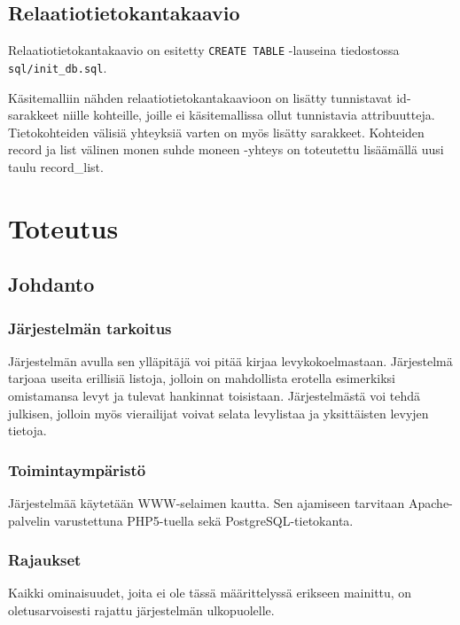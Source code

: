 \documentclass[a4paper,12pt]{report}
\begin{document}
\section{Relaatiotietokantakaavio}

Relaatiotietokantakaavio on esitetty \texttt{CREATE TABLE} -lauseina
tiedostossa \texttt{sql/init\_db.sql}.

Käsitemalliin nähden relaatiotietokantakaavioon on lisätty tunnistavat
id-sarakkeet niille kohteille, joille ei käsitemallissa ollut tunnistavia
attribuutteja. Tietokohteiden välisiä yhteyksiä varten on myös lisätty
sarakkeet. Kohteiden record ja list välinen monen suhde moneen -yhteys on
toteutettu lisäämällä uusi taulu record\_list.

\chapter{Toteutus}

\section{Johdanto}

\subsection{Järjestelmän tarkoitus}

Järjestelmän avulla sen ylläpitäjä voi pitää kirjaa levykokoelmastaan.
Järjestelmä tarjoaa useita erillisiä listoja, jolloin on mahdollista
erotella esimerkiksi omistamansa levyt ja tulevat hankinnat toisistaan.
Järjestelmästä voi tehdä julkisen, jolloin myös vierailijat voivat selata
levylistaa ja yksittäisten levyjen tietoja.

\subsection{Toimintaympäristö}

Järjestelmää käytetään WWW-selaimen kautta. Sen ajamiseen tarvitaan
Apache-palvelin varustettuna PHP5-tuella sekä PostgreSQL-tietokanta.

\subsection{Rajaukset}

Kaikki ominaisuudet, joita ei ole tässä määrittelyssä erikseen mainittu, on
oletusarvoisesti rajattu järjestelmän ulkopuolelle.
\end{document}
